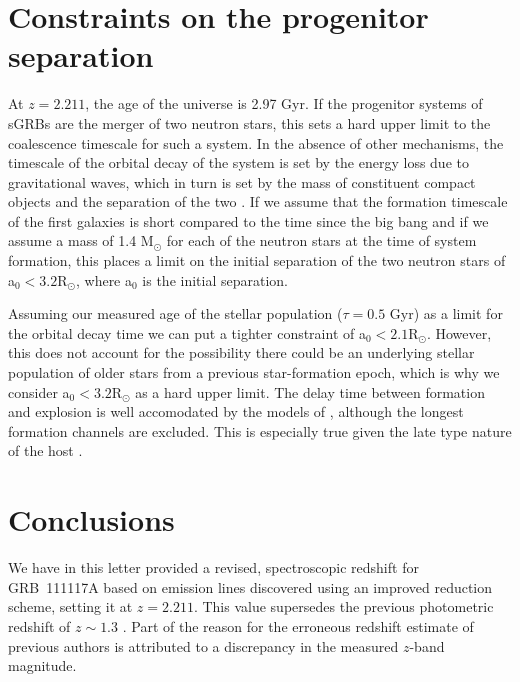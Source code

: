 \documentclass{aa}    %
\begin{document}
\section{Constraints on the progenitor separation}

At $z = 2.211$, the age of the universe is 2.97 Gyr. If the progenitor systems
of sGRBs are the merger of two neutron stars, this sets a hard upper limit to
the coalescence timescale for such a system. In the absence of other mechanisms,
the timescale of the orbital decay of the system is set by the energy loss due
to gravitational waves, which in turn is set by the mass of constituent compact
objects and the separation of the two \citep{Postnov2014}. If we assume that the
formation timescale of the first galaxies is short compared to the time since
the big bang \citep{Richard2011} and if we assume a mass of 1.4 M$_\odot$ for
each of the neutron stars at the time of system formation, this places a limit
on the initial separation of the two neutron stars of a$_0 < 3.2 $R$_\odot$,
where a$_0$ is the initial separation.

Assuming our measured age of the stellar population ($\tau = 0.5$ Gyr) as a
limit for the orbital decay time we can put a tighter constraint of a$_0 < 2.1
$R$_\odot$. However, this does not account for the possibility there could be an
underlying stellar population of older stars from a previous star-formation
epoch, which is why we consider a$_0 < 3.2 $R$_\odot$ as a hard upper limit. The
delay time between formation and explosion is well accomodated by the models of
\citet{Belczynski2006}, although the longest formation channels are excluded.
This is especially true given the late type nature of the host
\citep{OShaughnessy2008}.

\section{Conclusions}

We have in this letter provided a revised, spectroscopic redshift for
GRB~111117A based on emission lines discovered using an improved reduction
scheme, setting it at $z = 2.211$. This value supersedes the previous
photometric redshift of $z \sim 1.3$ \citep{Margutti2012, Sakamoto2013}. Part of
the reason for the erroneous redshift estimate of previous authors is attributed
to a discrepancy in the measured $z$-band magnitude.
\end{document}
